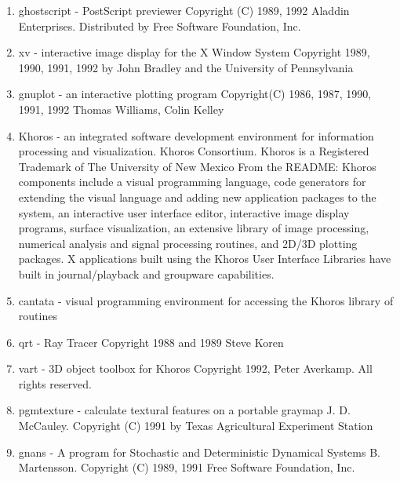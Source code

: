 \begin{enumerate}
\item{ghostscript}\label{soft-ghostscript}
  - PostScript previewer\hfil\break
  Copyright (C) 1989, 1992 Aladdin Enterprises.  Distributed by Free
  Software Foundation, Inc.

\item{xv}\label{soft-xv}
  - interactive image display for the X Window System\hfil\break
  Copyright 1989, 1990, 1991, 1992 by John Bradley and the University
  of Pennsylvania

\item{gnuplot}\label{soft-gnuplot}
  - an interactive plotting program\hfil\break
  Copyright(C) 1986, 1987, 1990, 1991, 1992 Thomas Williams, Colin
  Kelley

\item{Khoros}\label{soft-Khoros}
  - an integrated software development environment for
  information processing and visualization.\hfil\break
  Khoros Consortium. Khoros is a Registered Trademark of The University of New
  Mexico\hfil\break
  From the README:\hfil\break
  Khoros components include a visual programming language, code
  generators for extending the visual language and adding new
  application packages to the system, an interactive user interface
  editor, interactive image display programs, surface visualization,
  an extensive library of image processing, numerical analysis and
  signal processing routines, and 2D/3D plotting packages.  X
  applications built using the Khoros User Interface Libraries have
  built in journal/playback and groupware capabilities.

\item{cantata}\label{soft-cantata}
  - visual programming environment for accessing the
    Khoros library of routines

\item{qrt}\label{soft-qrt}
  - Ray Tracer\hfil\break
  Copyright 1988 and 1989 Steve Koren

\item{vart}\label{soft-vart}
  - 3D object toolbox for Khoros\hfil\break
  Copyright 1992, Peter Averkamp.  All rights reserved.

\item{pgmtexture}\label{soft-pgmtexture}
  - calculate textural features on a portable graymap\hfil\break
  J. D. McCauley. Copyright (C) 1991 by Texas Agricultural Experiment
  Station

\item{gnans}\label{soft-gnans}
  - A program for Stochastic and Deterministic Dynamical Systems\hfil\break
  B. Martensson. Copyright (C) 1989, 1991 Free Software Foundation,
  Inc.


\end{enumerate}
